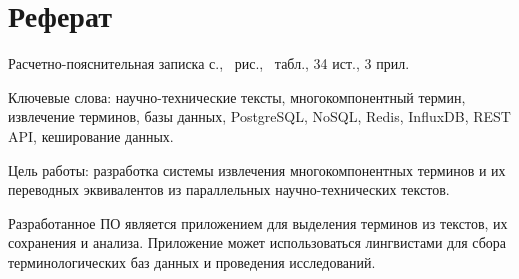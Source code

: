 \section*{Реферат}

Расчетно-пояснительная записка \pageref{LastPage} с., \totalfigures\ рис., \totaltables\ табл., 34 ист., 3 прил.

Ключевые слова: научно-технические тексты, многокомпонентный термин, извлечение терминов, базы данных, PostgreSQL, NoSQL, Redis, InfluxDB, REST API, кеширование данных.


Цель работы: разработка системы извлечения многокомпонентных терминов и их переводных эквивалентов из параллельных научно-технических текстов.

Разработанное ПО является приложением для выделения терминов из текстов, их сохранения и анализа. Приложение может использоваться лингвистами для сбора терминологических баз данных и проведения исследований.



\pagebreak